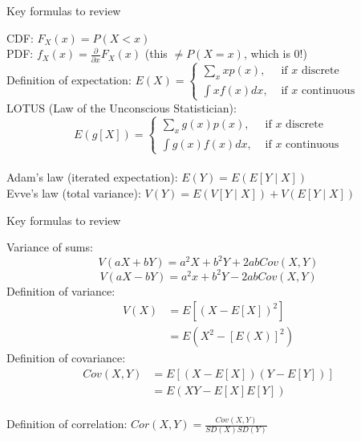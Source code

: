 \documentclass{beamer}
\begin{document}
\begin{frame}{Key formulas to review}
\begin{footnotesize}
CDF: $F_X(x)=P(X<x)$ \\
\medskip
PDF: $f_X(x)=\frac{\partial}{\partial x}F_X(x)$ (this $\neq P(X=x)$, which is 0!) \\
\medskip
Definition of expectation: $E(X)=\begin{cases}\sum_x xp(x),& \text{ if }x\text{ discrete} \\
\int x f(x) dx,&\text{ if }x\text{ continuous}\end{cases}$ \\
\medskip
LOTUS (Law of the Unconscious Statistician):
$$E(g[X])=\begin{cases}\sum_x g(x)p(x),& \text{ if }x\text{ discrete} \\
\int g(x) f(x) dx,&\text{ if }x\text{ continuous}\end{cases}$$ \\
\medskip
Adam's law (iterated expectation): $E(Y)=E(E[Y\mid X])$ \\
\medskip
Evve's law (total variance): $V(Y)=E(V[Y\mid X])+V(E[Y\mid X])$
\end{footnotesize}
\end{frame}

\begin{frame}{Key formulas to review}
\begin{footnotesize}
Variance of sums:
$$V(aX+bY)=a^2X+b^2Y+2abCov(X,Y)$$
$$V(aX-bY)=a^2x+b^2Y-2abCov(X,Y)$$
\medskip
Definition of variance:
\begin{align*}
V(X)&=E\left[\left(X-E[X]\right)^2\right] \\
&=E\left(X^2-\left[E(X)\right]^2\right)
\end{align*}
\medskip
Definition of covariance:
\begin{align*}
Cov(X,Y)&=E\left[\left(X-E[X]\right)\left(Y-E[Y]\right)\right] \\
&=E\left(XY-E[X]E[Y]\right)
\end{align*} \\
\medskip
Definition of correlation: $Cor(X,Y)=\frac{Cov(X,Y)}{SD(X)SD(Y)}$
\end{footnotesize}
\end{frame}
\end{document}
